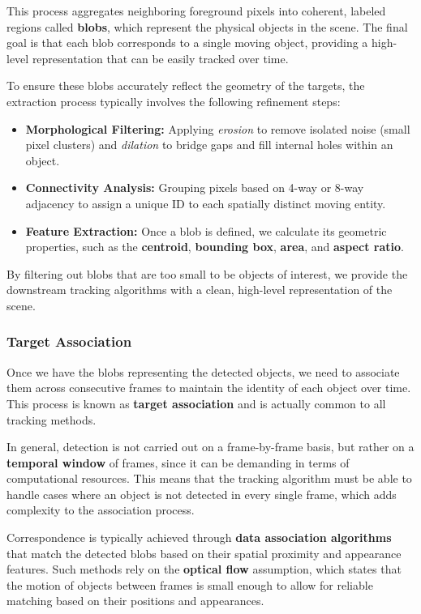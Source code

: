 This process aggregates neighboring foreground pixels into coherent, labeled regions called \textbf{blobs}, which represent the physical objects in the scene.
The final goal is that each blob corresponds to a single moving object, providing a high-level representation that can be easily tracked over time.

To ensure these blobs accurately reflect the geometry of the targets, the extraction process typically involves the following refinement steps:
\begin{itemize}
    \item \textbf{Morphological Filtering:} Applying \textit{erosion} to remove isolated noise (small pixel clusters) and \textit{dilation} to bridge gaps and fill internal holes within an object.
    \item \textbf{Connectivity Analysis:} Grouping pixels based on 4-way or 8-way adjacency to assign a unique ID to each spatially distinct moving entity.
    \item \textbf{Feature Extraction:} Once a blob is defined, we calculate its geometric properties, such as the \textbf{centroid}, \textbf{bounding box}, \textbf{area}, and \textbf{aspect ratio}.
\end{itemize}
By filtering out blobs that are too small to be objects of interest, we provide the downstream tracking algorithms with a clean, high-level representation of the scene.

\subsubsection{Target Association}
Once we have the blobs representing the detected objects, we need to associate them across consecutive frames to maintain the identity of each object over time.
This process is known as \textbf{target association} and is actually common to all tracking methods.

In general, detection is not carried out on a frame-by-frame basis, but rather on a \textbf{temporal window} of frames, since it can
be demanding in terms of computational resources. 
This means that the tracking algorithm must be able to handle cases where an object is not detected in every single frame, which adds complexity to the association process.

Correspondence is typically achieved through \textbf{data association algorithms} that match the detected blobs based on their spatial proximity and appearance features.
Such methods rely on the \textbf{optical flow} assumption, which states that the motion of objects between frames is small enough to allow for reliable matching based on their positions and appearances. 

